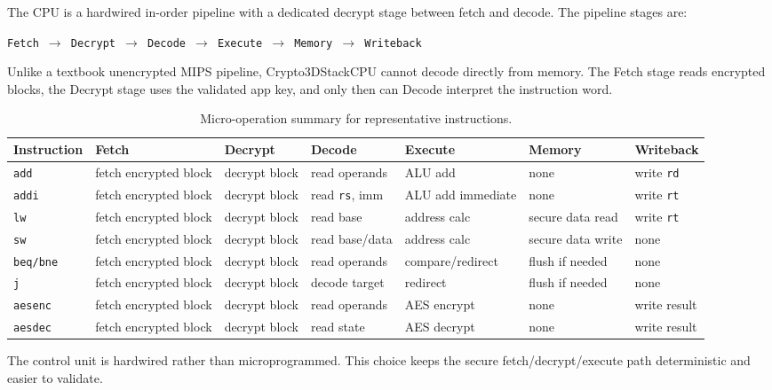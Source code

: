\documentclass[conference]{IEEEtran}
\begin{document}
The CPU is a hardwired in-order pipeline with a dedicated decrypt stage between fetch and decode. The pipeline stages are:

\begin{center}
\texttt{Fetch $\rightarrow$ Decrypt $\rightarrow$ Decode $\rightarrow$ Execute $\rightarrow$ Memory $\rightarrow$ Writeback}
\end{center}

Unlike a textbook unencrypted MIPS pipeline, Crypto3DStackCPU cannot decode directly from memory. The Fetch stage reads encrypted blocks, the Decrypt stage uses the validated app key, and only then can Decode interpret the instruction word.

\begin{table}[!t]
\caption{Micro-operation summary for representative instructions.}
\label{tab:microops}
\centering
\scriptsize
\begin{tabularx}{\textwidth}{@{}L{0.11\textwidth}YYYYYY@{}}
\toprule
Instruction & Fetch & Decrypt & Decode & Execute & Memory & Writeback \\
\midrule
\texttt{add} & fetch encrypted block & decrypt block & read operands & ALU add & none & write \texttt{rd} \\
\texttt{addi} & fetch encrypted block & decrypt block & read \texttt{rs}, imm & ALU add immediate & none & write \texttt{rt} \\
\texttt{lw} & fetch encrypted block & decrypt block & read base & address calc & secure data read & write \texttt{rt} \\
\texttt{sw} & fetch encrypted block & decrypt block & read base/data & address calc & secure data write & none \\
\texttt{beq/bne} & fetch encrypted block & decrypt block & read operands & compare/redirect & flush if needed & none \\
\texttt{j} & fetch encrypted block & decrypt block & decode target & redirect & flush if needed & none \\
\texttt{aesenc} & fetch encrypted block & decrypt block & read operands & AES encrypt & none & write result \\
\texttt{aesdec} & fetch encrypted block & decrypt block & read state & AES decrypt & none & write result \\
\bottomrule
\end{tabularx}
\end{table}

The control unit is hardwired rather than microprogrammed. This choice keeps the secure fetch/decrypt/execute path deterministic and easier to validate.
\end{document}
